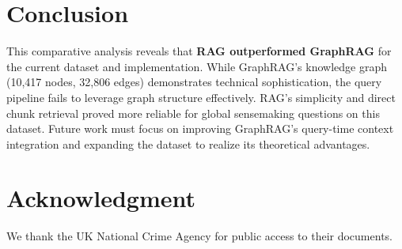 \documentclass[conference]{IEEEtran}
\begin{document}
\section{Conclusion}
This comparative analysis reveals that \textbf{RAG outperformed GraphRAG} for the current dataset and implementation. While GraphRAG's knowledge graph (10,417 nodes, 32,806 edges) demonstrates technical sophistication, the query pipeline fails to leverage graph structure effectively. RAG's simplicity and direct chunk retrieval proved more reliable for global sensemaking questions on this dataset. Future work must focus on improving GraphRAG's query-time context integration and expanding the dataset to realize its theoretical advantages.

\section*{Acknowledgment}
We thank the UK National Crime Agency for public access to their documents.



\end{document}
